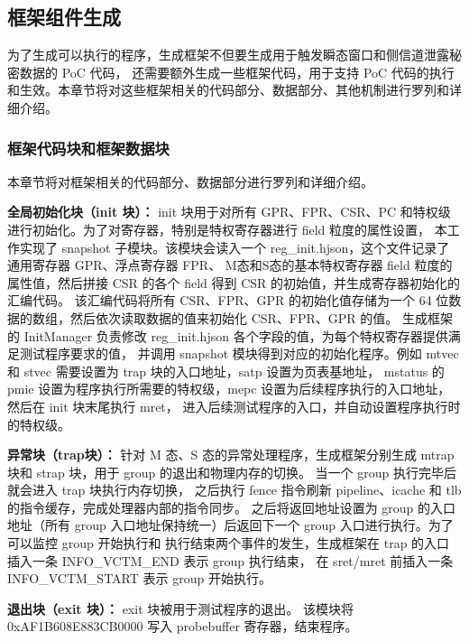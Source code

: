 \subsection{框架组件生成}

为了生成可以执行的程序，生成框架不但要生成用于触发瞬态窗口和侧信道泄露秘密数据的 PoC 代码，
还需要额外生成一些框架代码，用于支持 PoC 代码的执行和生效。本章节将对这些框架相关的代码部分、数据部分、其他机制进行罗列和详细介绍。\par

\subsubsection{框架代码块和框架数据块}
本章节将对框架相关的代码部分、数据部分进行罗列和详细介绍。

\textbf{全局初始化块（init 块）：}
init 块用于对所有 GPR、FPR、CSR、PC 和特权级进行初始化。为了对寄存器，特别是特权寄存器进行 field 粒度的属性设置，
本工作实现了 snapshot 子模块。该模块会读入一个 reg\_init.hjson，这个文件记录了通用寄存器 GPR、浮点寄存器 FPR、
M态和S态的基本特权寄存器 field 粒度的属性值，然后拼接 CSR 的各个 field 得到 CSR 的初始值，并生成寄存器初始化的汇编代码。
该汇编代码将所有 CSR、FPR、GPR 的初始化值存储为一个 64 位数据的数组，然后依次读取数据的值来初始化 CSR、FPR、GPR 的值。
生成框架的 InitManager 负责修改 reg\_init.hjson 各个字段的值，为每个特权寄存器提供满足测试程序要求的值，
并调用 snapshot 模块得到对应的初始化程序。例如 mtvec 和 stvec 需要设置为 trap 块的入口地址，satp 设置为页表基地址，
mstatus 的 pmie 设置为程序执行所需要的特权级，mepc 设置为后续程序执行的入口地址，然后在 init 块末尾执行 mret，
进入后续测试程序的入口，并自动设置程序执行时的特权级。\par

\textbf{异常块（trap块）：}
针对 M 态、S 态的异常处理程序，生成框架分别生成 mtrap 块和 strap 块，用于 group 的退出和物理内存的切换。
当一个 group 执行完毕后就会进入 trap 块执行内存切换，
之后执行 fence 指令刷新 pipeline、icache 和 tlb 的指令缓存，完成处理器内部的指令同步。
之后将返回地址设置为 group 的入口地址（所有 group 入口地址保持统一）后返回下一个 group 入口进行执行。为了可以监控 group 开始执行和
执行结束两个事件的发生，生成框架在 trap 的入口插入一条 INFO\_VCTM\_END 表示 group 执行结束，
在 sret/mret 前插入一条 INFO\_VCTM\_START 表示 group 开始执行。\par

\textbf{退出块（exit 块）：}
exit 块被用于测试程序的退出。
该模块将 0xAF1B608E883CB0000 写入 probebuffer 寄存器，结束程序。\par

